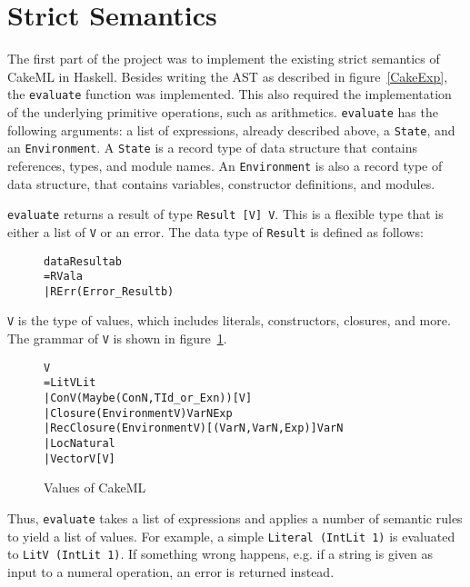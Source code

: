 
\section{Strict Semantics}
The first part of the project was to implement the existing strict semantics
of CakeML in Haskell. Besides writing the AST as described in
figure~\ref{CakeExp}, the \texttt{evaluate} function was implemented. This also
required the implementation of the underlying primitive operations, such as
arithmetics. \texttt{evaluate} has the following arguments: a list of
expressions, already described above, a \texttt{State}, and an
\texttt{Environment}. A \texttt{State} is a record type of data structure that
contains references, types, and module names. An \texttt{Environment} is also a
record type of data structure, that contains variables, constructor definitions,
and modules.

\texttt{evaluate} returns a result of type \texttt{Result [V] V}. This is a
flexible type that is either a list of \texttt{V} or an error. The data type
of \texttt{Result} is defined as follows:
\begin{figure}[H]
\begin{alltt}
data Result a b
  = RVal a
  | RErr (Error_Result b)
\end{alltt}
\end{figure}
\texttt{V} is the type of values, which includes literals, constructors,
closures, and more. The grammar of \texttt{V} is shown in figure~\ref{CakeV}.
\begin{figure}
\begin{alltt}
V
  = LitV Lit
  | ConV (Maybe (ConN, TId_or_Exn)) [V]
  | Closure (Environment V) VarN Exp
  | RecClosure (Environment V) [(VarN, VarN, Exp)] VarN
  | Loc Natural
  | VectorV [V]
\end{alltt}
\caption{Values of CakeML}
\label{CakeV}
\end{figure}
Thus, \texttt{evaluate} takes a list of expressions and applies a number of
semantic rules to yield a list of values. For example, a simple
\texttt{Literal (IntLit 1)} is evaluated to \texttt{LitV (IntLit 1)}.
If something wrong happens, e.g. if a string is given as input to a numeral
operation, an error is returned instead.

